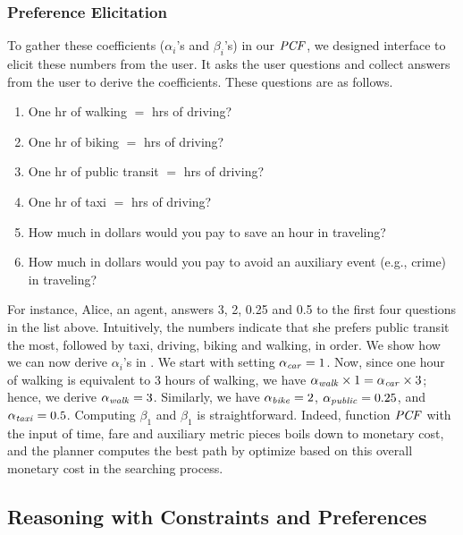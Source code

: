 \subsubsection{Preference Elicitation}
To gather these coefficients ($\alpha_i$'s and $\beta_i$'s) in our $\mathit{PCF}$, we designed interface to
elicit these numbers from the user.
It asks the user questions and collect answers from the user to derive the coefficients.
These questions are as follows.
\begin{enumerate}
	\item One hr of walking $=$ \underline{\hspace{1cm}} hrs of driving?
	\item One hr of biking $=$ \underline{\hspace{1cm}} hrs of driving?
	\item One hr of public transit $=$ \underline{\hspace{1cm}} hrs of driving?
	\item One hr of taxi $=$ \underline{\hspace{1cm}} hrs of driving?
	\item How much in dollars would you pay to save an hour in traveling?
	\item How much in dollars would you pay to avoid an auxiliary event (e.g., crime) in traveling?
\end{enumerate}
For instance, Alice, an agent, answers 3, 2, 0.25 and 0.5 to the first four questions in the list above.
Intuitively, the numbers indicate that she prefers public transit the most, followed by
taxi, driving, biking and walking, in order.
We show how we can now derive $\alpha_i$'s in .
We start with setting $\alpha_{\mathit{car}}=1$.
Now, since one hour of walking is equivalent to 3 hours of walking,
we have $\alpha_{\mathit{walk}} \times 1 = \alpha_{\mathit{car}} \times 3$;
hence, we derive $\alpha_{\mathit{walk}} = 3$.
Similarly, we have $\alpha_{\mathit{bike}} = 2$, $\alpha_{\mathit{public}} = 0.25$,
and $\alpha_{\mathit{taxi}} = 0.5$.
Computing $\beta_1$ and $\beta_1$ is straightforward.
Indeed, function $\mathit{PCF}$ with the input of time, fare and
auxiliary metric pieces boils down to monetary cost,
and the planner computes the best path by optimize
based on this overall monetary cost in the searching
process.

\subsection{Reasoning with Constraints and Preferences}

